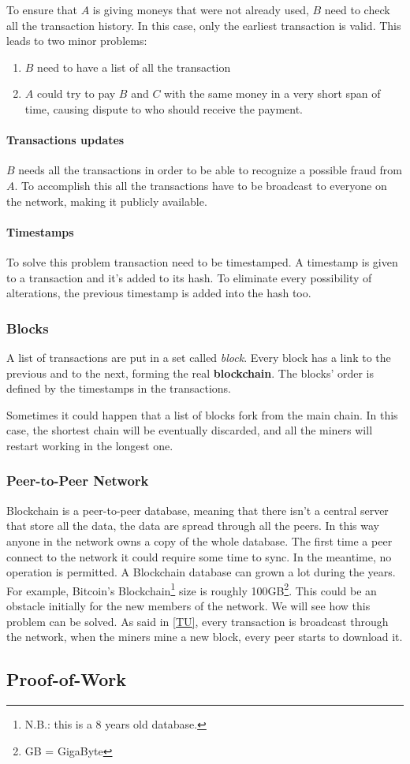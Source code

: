 To ensure that $A$ is giving moneys that were not already used, $B$ need to
check all the transaction history. In this case, only the earliest transaction
is valid\cite{nakamoto08}. This leads to two minor problems:
\begin{enumerate}
 \item $B$ need to have a list of all the transaction
 \item $A$ could try to pay $B$ and $C$ with the same money in a very short
span of time, causing dispute to who should receive the payment.
\end{enumerate}

\paragraph*{Transactions updates}
\label{TU}
$B$ needs all the transactions in order to be able to recognize a possible
fraud from $A$. To accomplish this all the transactions have to be broadcast to
everyone on the network, making it publicly available.

\paragraph*{Timestamps}
To solve this problem transaction need to be timestamped. A timestamp is given
to a transaction and it's added to its hash. To eliminate every possibility of
alterations, the previous timestamp is added into the hash too.

\subsubsection{Blocks}
A list of transactions are put in a set called \textit{block}. Every block has
a link to the previous and to the next, forming the real \textbf{blockchain}.
The blocks' order is defined by the timestamps in the transactions.

Sometimes it could happen that a list of blocks fork from the main chain. In
this case, the shortest chain will be eventually discarded, and all the miners
will restart working in the longest one\cite{sok15}.

\subsubsection{Peer-to-Peer Network}

Blockchain is a peer-to-peer database, meaning that there isn't a central
server that store all the data, the data are spread through all the peers.
In this way anyone in the network owns a copy of the whole database. The first
time a peer connect to the network it could require some time to sync. In the
meantime, no operation is permitted. A Blockchain database can grown a lot
during the years. For example, Bitcoin's Blockchain\footnote{N.B.: this is a 8
years old database.} size is roughly 100GB\footnote{GB = GigaByte}. This could
be an obstacle initially for the new members of the network. We will see how
this problem can be solved.
As said in \ref{TU}, every transaction is broadcast through the network, when
the miners mine a new block, every peer starts to download it.

\subsection{Proof-of-Work}

